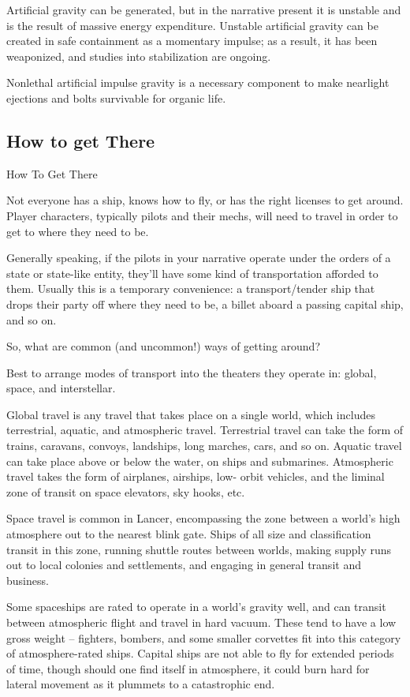 Artificial gravity can be generated, but in the narrative present it is unstable and is the result of
massive energy expenditure. Unstable artificial gravity can be created in safe containment as a
momentary impulse; as a result, it has been weaponized, and studies into stabilization are
ongoing.


Nonlethal artificial impulse gravity is a necessary component to make nearlight ejections and
bolts survivable for organic life.

\subsection{How to get There}
How To Get There

Not everyone has a ship, knows how to fly, or has the right licenses to get around. Player
characters, typically pilots and their mechs, will need to travel in order to get to where they need
to be.


Generally speaking, if the pilots in your narrative operate under the orders of a state or state-like
entity, they’ll have some kind of transportation afforded to them. Usually this is a temporary
convenience: a transport/tender ship that drops their party off where they need to be, a billet
aboard a passing capital ship, and so on.


So, what are common (and uncommon!) ways of getting around?


Best to arrange modes of transport into the theaters they operate in: global, space, and
interstellar.


Global travel is any travel that takes place on a single world, which includes terrestrial, aquatic,
and atmospheric travel. Terrestrial travel can take the form of trains, caravans, convoys,
landships, long marches, cars, and so on. Aquatic travel can take place above or below the
water, on ships and submarines. Atmospheric travel takes the form of airplanes, airships, low-
orbit vehicles, and the liminal zone of transit on space elevators, sky hooks, etc.


Space travel is common in Lancer, encompassing the zone between a world’s high atmosphere
out to the nearest blink gate. Ships of all size and classification transit in this zone, running
shuttle routes between worlds, making supply runs out to local colonies and settlements, and
engaging in general transit and business.


Some spaceships are rated to operate in a world’s gravity well, and can transit between
atmospheric flight and travel in hard vacuum. These tend to have a low gross weight --  fighters,
bombers, and some smaller corvettes fit into this category of atmosphere-rated ships. Capital
ships are not able to fly for extended periods of time, though should one find itself in
atmosphere, it could burn hard for lateral movement as it plummets to a catastrophic end.





